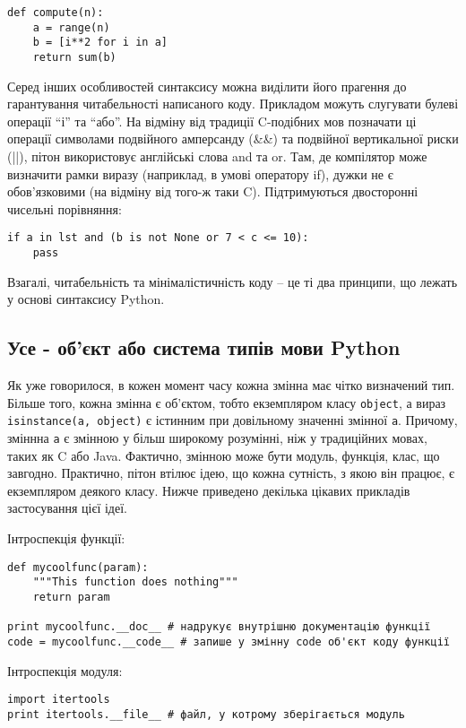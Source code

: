 \documentclass[a4paper, 12pt, onsedie]{article}
\begin{document}
\begin{verbatim}
def compute(n):
    a = range(n)
    b = [i**2 for i in a]
    return sum(b)
\end{verbatim}

Серед інших особливостей синтаксису можна виділити його прагення до
гарантування читабельності написаного коду. Прикладом можуть слугувати булеві операції ``і''
та ``або''. На відміну від традиції C-подібних мов позначати ці операції символами подвійного
амперсанду (\&\&) та подвійної вертикальної риски (||), пітон використовує англійські слова
and та or. Там, де компілятор може визначити рамки виразу (наприклад, в умові оператору if),
дужки не є обов'язковими (на відміну від того-ж таки C). Підтримуються двосторонні чисельні
порівняння:

\begin{verbatim}
if a in lst and (b is not None or 7 < c <= 10):
    pass
\end{verbatim}

Взагалі, читабельність та
мінімалістичність коду -- це ті два принципи, що лежать у основі синтаксису Python.

\subsection{Усе - об'єкт або система типів мови Python}
Як уже говорилося, в кожен момент часу кожна змінна має чітко визначений тип. Більше того,
кожна змінна є об'єктом, тобто екземпляром класу \texttt{object}, а вираз 
\texttt{isinstance(a, object)} є істинним при довільному значенні змінної \texttt{a}. 
Причому, зміннна \texttt{a} є змінною у більш широкому розумінні, ніж у традиційних
мовах, таких як C або Java. Фактично, змінною може бути модуль, функція, клас,
що завгодно. Практично, пітон втілює ідею, що кожна сутність, з якою він працює, є 
екземпляром деякого класу. Нижче приведено декілька цікавих прикладів застосування
цієї ідеї.

Інтроспекція функції:

\begin{verbatim}
def mycoolfunc(param):
    """This function does nothing"""
    return param

print mycoolfunc.__doc__ # надрукує внутрішню документацію функції
code = mycoolfunc.__code__ # запише у змінну code об'єкт коду функції
\end{verbatim}

Інтроспекція модуля:

\begin{verbatim}
import itertools
print itertools.__file__ # файл, у котрому зберігається модуль
\end{verbatim}
\end{document}
